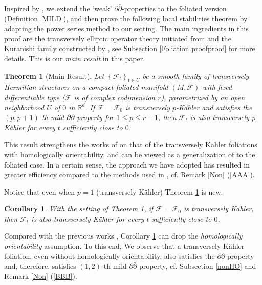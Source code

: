 \documentclass[12pt]{amsart}
\numberwithin{equation}{section}
\theoremstyle{definition}
\theoremstyle{definition}
\theoremstyle{definition}
\renewcommand{\1}{\mathsf{1}}
\renewcommand{\>}{\rightarrow}
\newcommand{\p}{\partial}
\newcommand{\bp}{\overline\partial}
\def\p{\partial}
\def\b{\bar}
\def\mc{\mathcal}
\theoremstyle{plain} %
\newtheorem{bigthm}{Theorem}
\theoremstyle{plain} %
\theoremstyle{plain} %
\newtheorem{bigcor}{Corollary}
\begin{document}
	Inspired by \cite{RWZ19},  we  extend the `weak' $\partial\bp$-properties to the  foliated version  (Definition \ref{MILD}), and then prove the following local stabilities theorem by adapting the power series method  to our setting. The main ingredients in this proof are the transversely elliptic operator theory initiated from \cite{EKA90} and the Kuranishi family constructed by \cite{EKAN89}, see
	Subsection \ref{Foliation proofproof} for more details. This is our  \textit{main result} in this paper.
	\begin{bigthm}[{Main Result}]\label{FOLiation Pkahler}
		Let $\left\{\mc F_t\right\}_{t\in U}$ be a smooth family of transversely Hermitian structures on a compact foliated manifold $(M,\mc F)$   with fixed differentiable type ($\mc F$ is of complex codimension $r$), parametrized by an open neighborhood $U$ of $0$ in $\mathbb{R}^{d}$. If   $\mathcal{F}=\mathcal{F}_{0}$ is transversely $p$-K\"ahler and satisfies the $(p,p+1)$-th mild $\p\b{\p}$-property for $1\leq p\leq r-1$, then $\mathcal{F}_{t}$ is also  transversely  $p$-K\"ahler for every $t$ sufficiently close to $0$.
	\end{bigthm}
	
	
This result strengthens the works of  \cite{EKAG97,Ra21}  on that of the transversely K\"ahler foliations with homologically orientability, and  can be viewed as a generalization of \cite[Theorem 1.1]{RWZ19} to the foliated case.  In a certain sense, the approach we have adopted has resulted in greater efficiency compared to the methods used in \cite{EKAG97,Ra21}, cf. Remark \ref{Non} (\ref{AAA}).

Notice that even when $p=1$ (transversely K\"ahler) Theorem \ref{FOLiation Pkahler}  is new.

\begin{bigcor}\label{1FOLiation 1kahler}
	With the setting of Theorem \ref{FOLiation Pkahler}, if   $\mathcal{F}=\mathcal{F}_{0}$ is transversely K\"ahler, then $\mathcal{F}_{t}$ is also  transversely  K\"ahler for every $t$ sufficiently close to $0$.
\end{bigcor}

Compared with the previous works \cite{EKAG97,Ra21}, Corollary \ref{1FOLiation 1kahler} can drop the \textit{homologically orientability} assumption. To this end, We observe that a transversely K\"ahler foliation, even without homologically orientability, also satisfies the $\p\bp$-property and, therefore,   satisfies $(1,2)$-th mild $\p\b{\p}$-property, cf. Subsection \ref{nonHO} and Remark \ref{Non} (\ref{BBB}).
	
\end{document}

